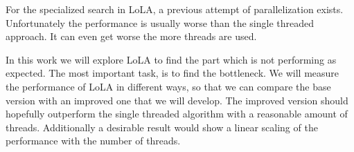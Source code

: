 For the specialized search in LoLA, a previous attempt of parallelization exists. Unfortunately the performance is usually worse than the single threaded approach. It can even get worse the more threads are used.

In this work we will explore LoLA to find the part which is not performing as expected. The most important task, is to find the bottleneck. We will measure the performance of LoLA in different ways, so that we can compare the base version with an improved one that we will develop. The improved version should hopefully outperform the single threaded algorithm with a reasonable amount of threads. Additionally a desirable result would show a linear scaling of the performance with the number of threads.



